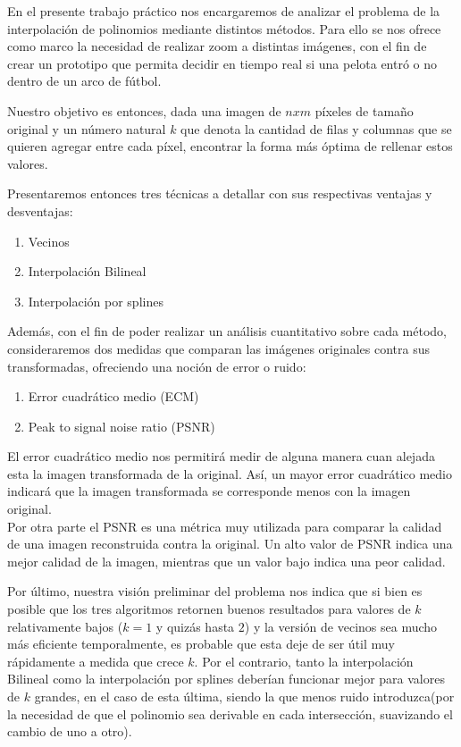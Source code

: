 En el presente trabajo práctico nos encargaremos de analizar el problema de la interpolación de polinomios mediante distintos métodos.
Para ello se nos ofrece como marco la necesidad de realizar zoom a distintas imágenes, con el fin de crear un prototipo que permita decidir en tiempo
real si una pelota entró o no dentro de un arco de fútbol.

Nuestro objetivo es entonces, dada una imagen de $n x m$ píxeles de tamaño original y un número natural $k$ que denota la cantidad de filas y
columnas que se quieren agregar entre cada píxel, encontrar la forma más óptima de rellenar estos valores.

Presentaremos entonces tres técnicas a detallar con sus respectivas ventajas y desventajas:
\begin{enumerate}
 \item Vecinos
 \item Interpolación Bilineal
 \item Interpolación por splines
\end{enumerate}

Además, con el fin de poder realizar un análisis cuantitativo sobre cada método, consideraremos dos medidas que comparan las imágenes
originales contra sus transformadas, ofreciendo una noción de error o ruido:
\begin{enumerate}
 \item Error cuadrático medio (ECM)
 \item Peak to signal noise ratio (PSNR)
\end{enumerate}

El error cuadrático medio nos permitirá medir de alguna manera cuan alejada esta la imagen transformada de la original. Así, un mayor error cuadrático medio indicará que la imagen transformada se corresponde menos con la imagen original.
\\
Por otra parte el PSNR es una métrica muy utilizada para comparar la calidad de una imagen reconstruida contra la original. Un alto valor de PSNR indica una mejor calidad de la imagen, mientras que un valor bajo indica una peor calidad.

Por último, nuestra visión preliminar del problema nos indica que si bien es posible que los tres algoritmos retornen buenos resultados
para valores de $k$ relativamente bajos ($k = 1$ y quizás hasta $2$) y la versión de vecinos sea mucho más eficiente temporalmente,
es probable que esta deje de ser útil muy rápidamente a medida que crece $k$. Por el contrario, tanto la interpolación Bilineal como la
interpolación por splines deberían funcionar mejor para valores de $k$ grandes, en el caso de esta última, siendo la que menos ruido introduzca(por la necesidad de que el polinomio sea derivable en cada intersección, suavizando el cambio de uno a otro).
